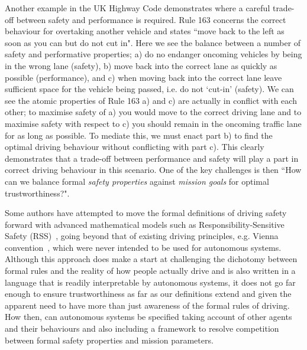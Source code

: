 \documentclass[sigconf]{acmart}
\begin{document}
Another example in the UK Highway Code demonstrates where a careful trade-off between safety and performance is required. 
%
Rule 163 concerns the correct behaviour for overtaking another vehicle and states ``move back to the left as soon as you can but do not cut in". 
%
Here we see the balance between a number of safety and performative properties; a) do no endanger oncoming vehicles by being in the wrong lane (safety), b) move back into the correct lane as quickly as possible (performance), and c) when moving back into the correct lane leave sufficient space for the vehicle being passed, i.e. do not `cut-in' (safety). 
%
We can see the atomic properties of Rule 163 a) and c) are actually in conflict with each other; 
%
to maximise safety of a) you would move to the correct driving lane and to maximise safety with respect to c) you should remain in the oncoming traffic lane for as long as possible. 
%
To mediate this, we must enact part b) to find the optimal driving behaviour without conflicting with part c). 
%
This clearly demonstrates that a trade-off between performance and safety will play a part in correct driving behaviour in this scenario. 
%
One of the key challenges is then ``How can we balance formal \emph{safety properties} against \emph{mission goals} for optimal trustworthiness?". 

%
Some authors have attempted to move the formal definitions of driving safety forward with advanced mathematical models such as Responsibility-Sensitive Safety (RSS)~\cite{shalevshwartz2018formal}, going beyond that of existing driving principles, e.g. Vienna convention~\cite{vienna}, which were never intended to be used for autonomous systems. Although this approach does make a start at challenging the dichotomy between formal rules and the reality of how people actually drive and is also written in a language that is readily interpretable by autonomous systems, it does not go far enough to ensure trustworthiness as far as our definitions extend and given the apparent need to have more than just awareness of the formal rules of driving. 
%
How then, can autonomous systems be specified taking account of other agents and their behaviours and also including a framework to resolve competition between formal safety properties and mission parameters. 
\end{document}
